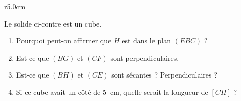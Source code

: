 
\begin{exercice}\label{exoSeconde-0087}

\begin{wrapfigure}{r}{5.0cm}
    \vspace{-1cm}
    \centering
    
\end{wrapfigure}

        Le solide ci-contre est un cube. 
        \begin{enumerate}
            \item
                Pourquoi peut-on affirmer que \( H\) est dans le plan \( (EBC)\) ?
            \item
                Est-ce que \( (BG)\) et \( (CF)\) sont perpendiculaires.
            \item
                Est-ce que \( (BH)\) et \( (CE)\) sont sécantes ? Perpendiculaires ?
            \item
                Si ce cube avait un côté de \SI{5}{\centi\meter}, quelle serait la longueur de \( [CH]\) ?
        \end{enumerate}


\end{exercice}
